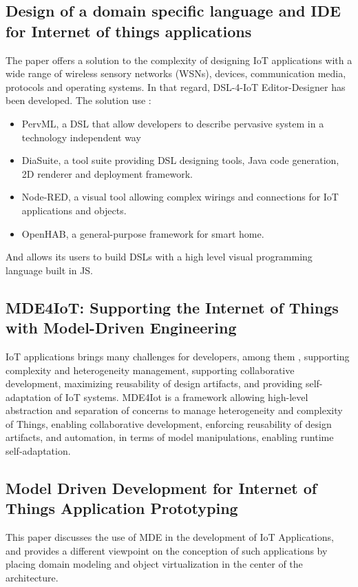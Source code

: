 \subsection{Design of a domain specific language and IDE for Internet of things applications}
The paper offers a solution to the complexity of designing IoT applications with a wide range of wireless sensory networks (WSNs), devices, communication media, protocols and operating systems. In that regard, DSL-4-IoT Editor-Designer has been developed. The solution use : 
\begin{itemize}
    \item 
PervML,  a DSL that allow developers to describe pervasive system in a technology independent way 
\item
DiaSuite, a tool suite providing DSL designing tools, Java code generation, 2D renderer and deployment framework. 
\item
Node-RED, a visual tool allowing complex wirings and connections for IoT applications and objects.
\item
OpenHAB, a general-purpose framework for smart home.
\end{itemize}
And allows its users to build DSLs with a high level visual programming language built in JS.

\subsection{MDE4IoT: Supporting the Internet of Things with Model-Driven Engineering}
IoT applications brings many challenges for developers, among them , supporting complexity and heterogeneity management, supporting collaborative development, maximizing reusability of design artifacts, and providing self-adaptation of IoT systems. MDE4Iot is a framework allowing  high-level abstraction and separation of concerns to manage heterogeneity and complexity of Things, enabling collaborative development, enforcing reusability of design artifacts, and automation, in terms of model manipulations, enabling runtime self-adaptation. 

\subsection{Model Driven Development for Internet of Things Application Prototyping}
This paper discusses the use of MDE in the development of IoT Applications, and provides a different viewpoint on the conception of such applications by placing domain modeling and object virtualization in the center of the architecture.

